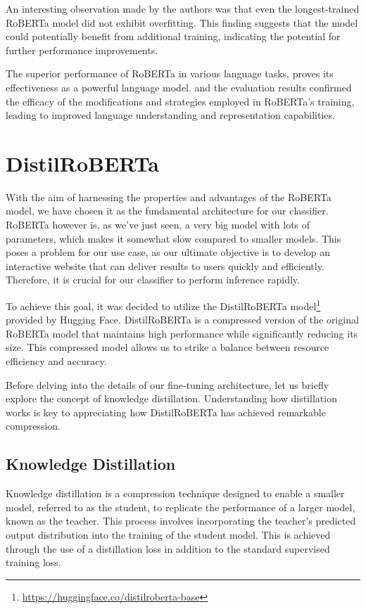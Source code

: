 \documentclass[a4paper,10pt]{report} %
\begin{document}
An interesting observation made by the authors was that even the longest-trained RoBERTa model did not exhibit overfitting. This finding suggests that the model could potentially benefit from additional training, indicating the potential for further performance improvements.

The superior performance of RoBERTa in various language tasks, proves its effectiveness as a powerful language model. and the evaluation results confirmed the efficacy of the modifications and strategies employed in RoBERTa's training, leading to improved language understanding and representation capabilities. \cite{roberta}

\section{DistilRoBERTa} %
With the aim of harnessing the properties and advantages of the RoBERTa model, we have chosen it as the fundamental architecture for our classifier. RoBERTa however is, as we've just seen, a very big model with lots of parameters, which makes it somewhat slow compared to smaller models. This poses a problem for our use case, as our ultimate objective is to develop an interactive website that can deliver results to users quickly and efficiently. Therefore, it is crucial for our classifier to perform inference rapidly.

To achieve this goal, it was decided to utilize the DistilRoBERTa model\footnote{\url{https://huggingface.co/distilroberta-base}} provided by Hugging Face. DistilRoBERTa is a compressed version of the original RoBERTa model that maintains high performance while significantly reducing its size. This compressed model allows us to strike a balance between resource efficiency and accuracy.

Before delving into the details of our fine-tuning architecture, let us briefly explore the concept of knowledge distillation. Understanding how distillation works is key to appreciating how DistilRoBERTa has achieved remarkable compression. \cite{distilbert}

\subsection{Knowledge Distillation} %
Knowledge distillation is a compression technique designed to enable a smaller model, referred to as the student, to replicate the performance of a larger model, known as the teacher. This process involves incorporating the teacher's predicted output distribution into the training of the student model. This is achieved through the use of a distillation loss in addition to the standard supervised training loss.
\end{document}

